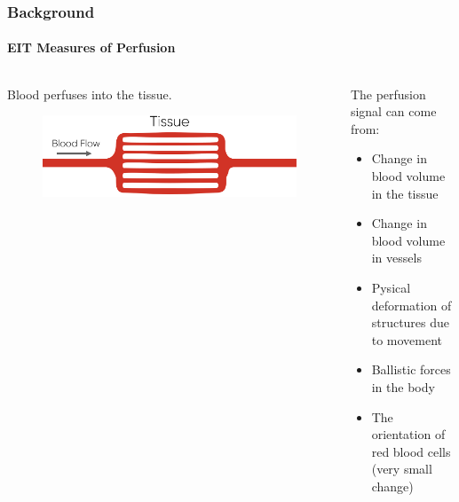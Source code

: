 \documentclass[10pt,    %
    english,            %
    xcolor=table,       %
    envcountsect,        %
    aspectratio=1610
]{beamer}
\begin{document}
\begin{frame}
	\frametitle{Background}
	\framesubtitle{EIT Measures of Perfusion}
	\begin{columns}[c]
		\begin{column}{0.5\textwidth}
			Blood perfuses into the tissue. \\ \vspace{2mm}
			\begin{figure}[H]
				\centering
				\includegraphics[width=\textwidth]{perfusion_sketch.pdf}
			\end{figure}
		\end{column}
		\begin{column}{0.5\textwidth}
			The perfusion signal can come from: \\ \vspace{2mm}
			\begin{itemize}
				\item Change in blood volume in the tissue
				\item Change in blood volume in vessels
				\item Pysical deformation of structures due to movement
				\item Ballistic forces in the body 
				\item The orientation of red blood cells (very small change)
			\end{itemize}
		\end{column}
	\end{columns}
\end{frame}
\end{document}
